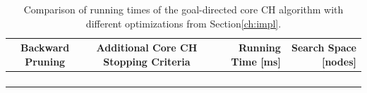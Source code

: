 \begin{table}[hbtp]
	\centering
	\begin{tabular}{ccrr}
		\toprule
		Backward Pruning & Additional Core CH Stopping Criteria & Running Time [\si{\milli\second}] & Search Space [nodes] \\
		\midrule
		\xmark           & \xmark                               &                                   &                      \\
		\cmark           & \xmark                               &                                   &                      \\
		\xmark           & \cmark                               &                                   &                      \\
		\cmark           & \cmark                               &                                   &                      \\
		\bottomrule
	\end{tabular}
	\caption{Comparison of running times of the goal-directed core CH algorithm with different optimizations from Section\ref{ch:impl}.}
	\label{tbl:opt_runtime}
\end{table}